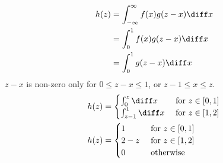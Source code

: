 \documentclass{article}
\begin{document}
\begin{aprob}
\begin{enumerate}
        \begin{align*}
            h(z) &= \int_{-\infty}^\infty f(x) g( z - x ) \diff x \\
            &= \int_{0}^1 f(x)g(z-x) \diff x \\
            & = \int_0^1 g(z-x) \diff x
        \end{align*}
        $z-x$ is non-zero only for $0 \leq z-x \leq 1$, or $z-1 \leq x \leq z$.
        \begin{align*}
            h(z)&= \begin{cases}
                \int_0^z \diff x & \text{ for } z \in [0,1] \\
                \int_{z-1}^1 \diff x & \text{ for } z \in [1,2]
            \end{cases}
             \\
             h(z) &= \begin{cases}
                1 & \text{ for } z \in [0,1] \\
                2-z & \text{ for } z \in [1,2] \\
                0 & \text{ otherwise }\\
            \end{cases}
        \end{align*}
    \end{enumerate}
\end{aprob}
\end{document}
